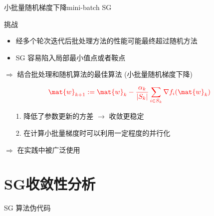 \documentclass[handout]{beamer}
\begin{document}
\begin{frame}
{小批量随机梯度下降mini-batch SG}

{\color{red}挑战}
\begin{itemize}
\item 经多个轮次迭代后批处理方法的性能可能最终超过随机方法
\item SG 容易陷入局部最小值点或者鞍点
\end{itemize}
$\Rightarrow$ 结合批处理和随机算法的最佳算法 ({\color{dblue}小批量随机梯度下降})

 $$ {\color{red}\mat{w}_{k+1}:=\mat{w}_k-\frac{\alpha_k}{|S_k|}\sum\limits_{i\in S_k}\nabla f_i(\mat{w}_k)}$$

\begin{itemize}
  \item[1.] 降低了参数更新的方差 $\rightarrow$ 收敛更稳定
  \item[2.] 在计算小批量梯度时可以利用一定程度的并行化
\end{itemize}

$\Rightarrow$ 在实践中被广泛使用

\end{frame}

\section{ SG收敛性分析}


\begin{frame}
{SG 算法伪代码}

\begin{center}

\end{center}


\end{frame}
\end{document}
